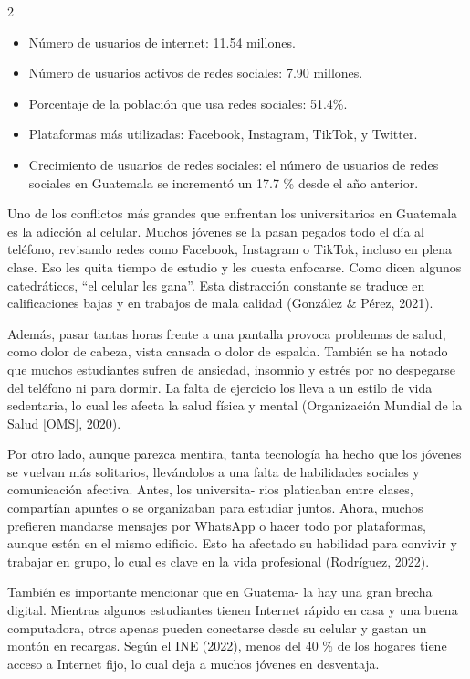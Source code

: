 \documentclass[12pt,spanish,Letterpaper,openany]{book}
\begin{document}
\begin {multicols}{2}
\begin{itemize}
\item
  Número de usuarios de internet: 11.54 millones.
\item
  Número de usuarios activos de redes sociales: 7.90 millones.
\item
  Porcentaje de la población que usa redes sociales: 51.4\%.
\item
  Plataformas más utilizadas: Facebook, Instagram, TikTok, y Twitter.
\item
  Crecimiento de usuarios de redes sociales: el número de usuarios de redes sociales en Guatemala se incrementó un 17.7 \% desde el año anterior.
\end{itemize}

Uno de los conflictos más grandes que enfrentan los universitarios en Guatemala es la adicción al celular. Muchos jóvenes se la pasan pegados todo el día al teléfono, revisando redes como Facebook, Instagram o TikTok, incluso en plena clase. Eso les quita tiempo de estudio y les cuesta enfocarse. Como dicen algunos catedráticos, ``el celular les gana''. Esta distracción constante se traduce en calificaciones bajas y en trabajos de mala calidad (González \& Pérez, 2021).

Además, pasar tantas horas frente a una pantalla provoca problemas de salud, como dolor de cabeza, vista cansada o dolor de espalda. También se ha notado que muchos estudiantes sufren de ansiedad, insomnio y estrés por no despegarse del teléfono ni para dormir. La falta de ejercicio los lleva a un estilo de vida sedentaria, lo cual les afecta la salud física y mental (Organización Mundial de la Salud {[}OMS{]}, 2020).

Por otro lado, aunque parezca mentira, tanta tecnología ha hecho que los jóvenes se vuelvan más solitarios, llevándolos a una falta de habilidades sociales y comunicación afectiva. Antes, los universita-
rios platicaban entre clases, compartían apuntes o se organizaban para estudiar juntos. Ahora, muchos prefieren mandarse mensajes por WhatsApp o hacer todo por plataformas, aunque estén en el mismo edificio. Esto ha afectado su habilidad para convivir y trabajar en grupo, lo cual es clave en la vida profesional (Rodríguez, 2022).

También es importante mencionar que en Guatema-
la hay una gran brecha digital. Mientras algunos estudiantes tienen Internet rápido en casa y una buena computadora, otros apenas pueden conectarse desde su celular y gastan un montón en recargas. Según el INE (2022), menos del 40 \% de los hogares tiene acceso a Internet fijo, lo cual deja a muchos jóvenes en desventaja.


\end{multicols}
\end{document}

